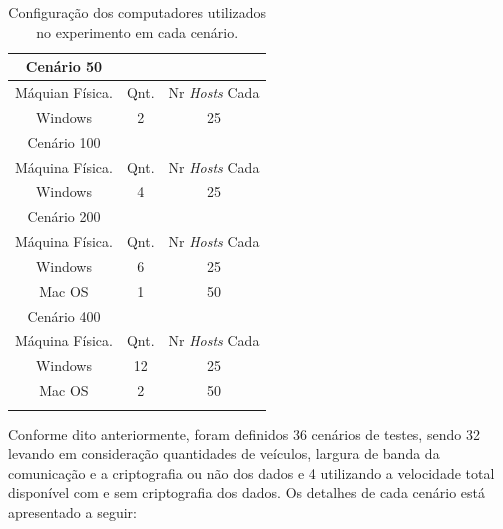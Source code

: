 \documentclass[
	12pt,				%
	oneside,			%
	a4paper,			%
	english,			%
	brazil				%
	]{abntex2ppgsi}
\begin{document}
\begin{longtable}{ |c |c |c |} 
	\hline
	\rowcolor[gray]{0.7}
	Cenário 50 &	& 	  \\ \hline
	\rowcolor[gray]{0.7}
	Máquian Física.	& Qnt. & Nr \textit{Hosts} Cada	 \\ \hline
	Windows	& 2 & 25 	\\ \hline
	\rowcolor[gray]{0.7}
	Cenário 100 &	& 	  \\ \hline
	\rowcolor[gray]{0.7}
	Máquina Física.	& Qnt. & Nr \textit{Hosts} Cada	 \\ \hline
	Windows	& 4 & 25 	\\ \hline
	\rowcolor[gray]{0.7}	
	Cenário 200 &	& 	  \\ \hline
	\rowcolor[gray]{0.7}
	Máquina Física.	& Qnt. & Nr \textit{Hosts} Cada	 \\ \hline
	Windows	& 6 & 25 	\\ \hline
	Mac OS	& 1 & 50 	\\ \hline
	\rowcolor[gray]{0.7}	
	Cenário 400 &	& 	  \\ \hline
	\rowcolor[gray]{0.7}
	Máquina Física.	& Qnt. & Nr \textit{Hosts} Cada	 \\ \hline
	Windows	& 12 & 25 	\\ \hline
	Mac OS	& 2 & 50 	\\ \hline
	\caption{Configuração dos computadores utilizados no experimento em cada cenário. } 
	\label{tab:configuracaoCenarios}
\end{longtable}

Conforme dito anteriormente, foram definidos 36 cenários de testes, sendo 32 levando em consideração quantidades de veículos, largura de banda da comunicação e a criptografia ou não dos dados e 4 utilizando a velocidade total disponível com e sem criptografia dos dados. Os detalhes de cada cenário está apresentado a seguir:
\end{document}
